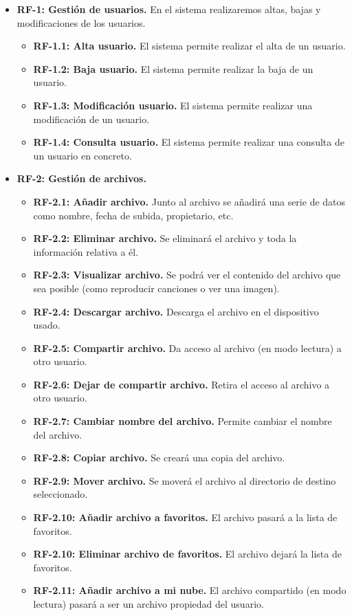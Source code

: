 \begin{itemize}
	\item \textbf{RF-1: Gestión de usuarios.} En el sistema realizaremos altas, bajas y modificaciones de los usuarios.
	\begin{itemize}
		\item \textbf{RF-1.1: Alta usuario.} El sistema permite realizar el alta de un usuario.
		\item \textbf{RF-1.2: Baja usuario.} El sistema permite realizar la baja de un usuario.
		\item \textbf{RF-1.3: Modificación usuario.} El sistema permite realizar una modificación de un usuario.
		\item \textbf{RF-1.4: Consulta usuario.} El sistema permite realizar una consulta de un usuario en concreto.
	\end{itemize}
	
	\item \textbf{RF-2: Gestión de archivos.}
	\begin{itemize}
		\item \textbf{RF-2.1: Añadir archivo.} Junto al archivo se añadirá una serie de datos como nombre, fecha de subida, propietario, etc.
		\item \textbf{RF-2.2: Eliminar archivo.} Se eliminará el archivo y toda la información relativa a él.
		\item \textbf{RF-2.3: Visualizar archivo.} Se podrá ver el contenido del archivo que sea posible (como reproducir canciones o ver una imagen).
		\item \textbf{RF-2.4: Descargar archivo.} Descarga el archivo en el dispositivo usado.
		\item \textbf{RF-2.5: Compartir archivo.} Da acceso al archivo (en modo lectura) a otro usuario.
		\item \textbf{RF-2.6: Dejar de compartir archivo.} Retira el acceso al archivo a otro usuario.
		\item \textbf{RF-2.7: Cambiar nombre del archivo.} Permite cambiar el nombre del archivo.
		\item \textbf{RF-2.8: Copiar archivo.} Se creará una copia del archivo.
		\item \textbf{RF-2.9: Mover archivo.} Se moverá el archivo al directorio de destino seleccionado.
		\item \textbf{RF-2.10: Añadir archivo a favoritos.} El archivo pasará a la lista de favoritos.
		\item \textbf{RF-2.10: Eliminar archivo de favoritos.} El archivo dejará la lista de favoritos.
		\item \textbf{RF-2.11: Añadir archivo a mi nube.} El archivo compartido (en modo lectura) pasará a ser un archivo propiedad del usuario.
	\end{itemize}
	

\end{itemize}
